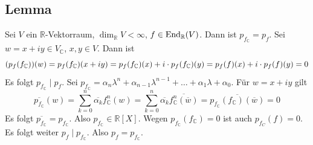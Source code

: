 \subsection[Lemma: Gleichheit der Minimalpolynome eines Endomorphismus und seiner Komplexifizierung]{Lemma} %
\label{sub:116}
Sei $V$ ein $\mathds{R}$-Vektorraum, $\dim_\mathds{R} V < \infty$, $f \in \operatorname{End}_{\mathbb{R}}(V)$. Dann ist $p_{f_\mathds{C}} = p_f$.
Sei $w= x + iy \in V_\mathds{C}$, $ x,y \in V$. Dann ist 
\[
	(p_f (f_{\mathbb{C}})) (w) = p_f(f_{\mathbb{C}})(x+iy) = p_f (f_{\mathbb{C}}) (x) + i \cdot p_f(f_{\mathbb{C}})(y)  =p_f (f) (x) + i \cdot  p_f (f)(y) = 0
\]
Es folgt $p_{f_\mathds{C}} \mid p_f$. Sei $p_{f_\mathds{C}} = \alpha_n \lambda^n + \alpha_{n-1} \lambda ^{n-1} + \ldots  + \alpha_1 \lambda  + \alpha_0$. Für 
$w=x+iy$ gilt
\[
	\overline{p_{f_\mathds{C}}} (w) = \sum_{k=0}^{n} \overline{\alpha_k} f_\mathds{C}^n (w) = \sum_{k=0}^{n} \overline{\alpha_k} \overline{f_\mathds{C}^n (\overline{w} )} 
	= \overline{p_{f_\mathds{C}} (f_\mathds{C}) (\overline{w} )} = 0    
\]
Es folgt $\overline{p_{f_\mathds{C}}} = p_{f_\mathds{C}}$. Also $p_{f_\mathds{C}} \in \mathds{R}[X]$. Wegen $p_{f_\mathds{C}} (f_\mathds{C}) = 0$ ist auch
$p_{f_C} (f) =0$. Es folgt weiter $p_f \mid p_{f_\mathds{C}}$. Also $p_f = p_{f_\mathds{C}}$. \bewende

